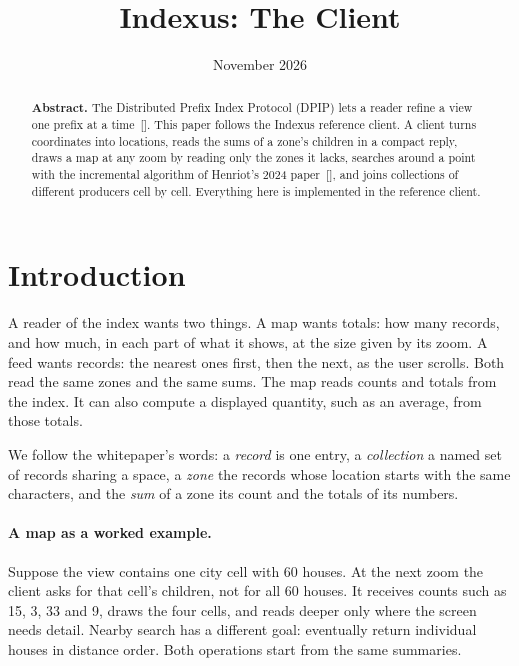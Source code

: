 \documentclass[11pt]{article}
\begin{document}
\title{Indexus: The Client}
\author{\ixbyline}
\date{November 2026}
\maketitle

\begin{abstract}
\noindent \textbf{Abstract. }The Distributed Prefix Index Protocol (DPIP) lets a reader refine a view one prefix at a time~[]. This paper follows the Indexus reference client. A client turns coordinates into locations, reads the sums of a zone's children in a compact reply, draws a map at any zoom by reading only the zones it lacks, searches around a point with the incremental algorithm of Henriot's 2024 paper~[], and joins collections of different producers cell by cell. Everything here is implemented in the reference client.
\vspace{1em}\end{abstract}

\section{Introduction}
A reader of the index wants two things. A map wants totals: how many records, and how much, in each part of what it shows, at the size given by its zoom. A feed wants records: the nearest ones first, then the next, as the user scrolls. Both read the same zones and the same sums. The map reads counts and totals from the index. It can also compute a displayed quantity, such as an average, from those totals.

We follow the whitepaper's words: a \emph{record} is one entry, a \emph{collection} a named set of records sharing a space, a \emph{zone} the records whose location starts with the same characters, and the \emph{sum} of a zone its count and the totals of its numbers.

\paragraph{A map as a worked example.}
Suppose the view contains one city cell with 60 houses. At the next zoom the client asks for that cell's children, not for all 60 houses. It receives counts such as 15, 3, 33 and 9, draws the four cells, and reads deeper only where the screen needs detail. Nearby search has a different goal: eventually return individual houses in distance order. Both operations start from the same summaries.
\end{document}
